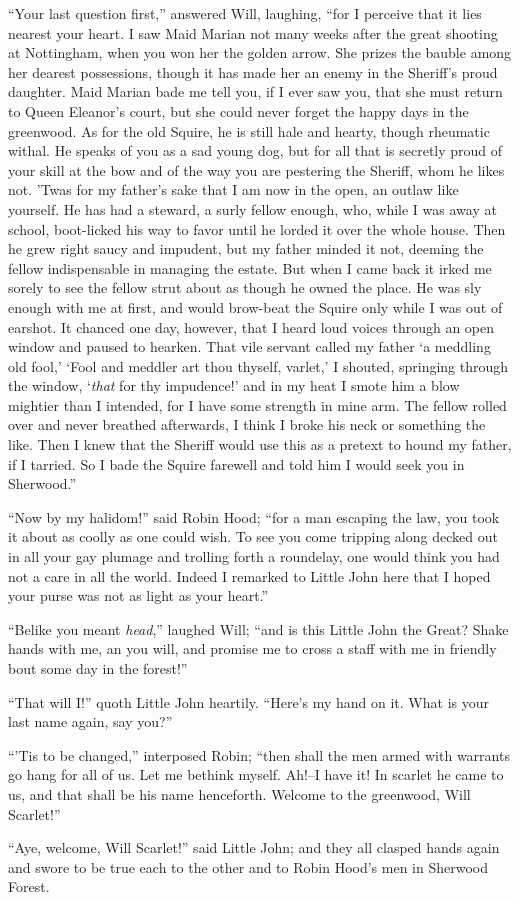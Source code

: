 ``Your last question first,'' answered Will, laughing, ``for I perceive
that it lies nearest your heart. I saw Maid Marian not many weeks after
the great shooting at Nottingham, when you won her the golden arrow. She
prizes the bauble among her dearest possessions, though it has made her
an enemy in the Sheriff's proud daughter. Maid Marian bade me tell you,
if I ever saw you, that she must return to Queen Eleanor's court, but
she could never forget the happy days in the greenwood. As for the old
Squire, he is still hale and hearty, though rheumatic withal. He speaks
of you as a sad young dog, but for all that is secretly proud of your
skill at the bow and of the way you are pestering the Sheriff, whom he
likes not. 'Twas for my father's sake that I am now in the open, an
outlaw like yourself. He has had a steward, a surly fellow enough, who,
while I was away at school, boot-licked his way to favor until he lorded
it over the whole house. Then he grew right saucy and impudent, but my
father minded it not, deeming the fellow indispensable in managing the
estate. But when I came back it irked me sorely to see the fellow strut
about as though he owned the place. He was sly enough with me at first,
and would brow-beat the Squire only while I was out of earshot. It
chanced one day, however, that I heard loud voices through an open
window and paused to hearken. That vile servant called my father `a
meddling old fool,' `Fool and meddler art thou thyself, varlet,' I
shouted, springing through the window, `\emph{that} for thy impudence!'
and in my heat I smote him a blow mightier than I intended, for I have
some strength in mine arm. The fellow rolled over and never breathed
afterwards, I think I broke his neck or something the like. Then I knew
that the Sheriff would use this as a pretext to hound my father, if I
tarried. So I bade the Squire farewell and told him I would seek you in
Sherwood.''

``Now by my halidom!'' said Robin Hood; ``for a man escaping the law,
you took it about as coolly as one could wish. To see you come tripping
along decked out in all your gay plumage and trolling forth a roundelay,
one would think you had not a care in all the world. Indeed I remarked
to Little John here that I hoped your purse was not as light as your
heart.''

``Belike you meant \emph{head},'' laughed Will; ``and is this Little
John the Great? Shake hands with me, an you will, and promise me to
cross a staff with me in friendly bout some day in the forest!''

``That will I!'' quoth Little John heartily. ``Here's my hand on it.
What is your last name again, say you?''

``'Tis to be changed,'' interposed Robin; ``then shall the men armed
with warrants go hang for all of us. Let me bethink myself. Ah!--I have
it! In scarlet he came to us, and that shall be his name henceforth.
Welcome to the greenwood, Will Scarlet!''

``Aye, welcome, Will Scarlet!'' said Little John; and they all clasped
hands again and swore to be true each to the other and to Robin Hood's
men in Sherwood Forest.

